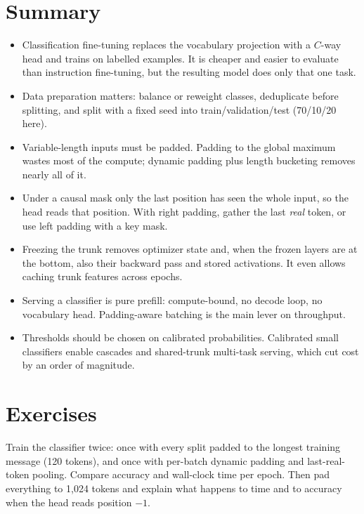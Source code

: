 \section{Summary}\label{sec:classify:summary}
\begin{itemize}
\item Classification fine-tuning replaces the vocabulary projection with a $C$-way head
and trains on labelled examples. It is cheaper and easier to evaluate than instruction
fine-tuning, but the resulting model does only that one task.
\item Data preparation matters: balance or reweight classes, deduplicate before
splitting, and split with a fixed seed into train/validation/test (70/10/20 here).
\item Variable-length inputs must be padded. Padding to the global maximum wastes most
of the compute; dynamic padding plus length bucketing removes nearly all of it.
\item Under a causal mask only the last position has seen the whole input, so the head
reads that position. With right padding, gather the last \emph{real} token, or use left
padding with a key mask.
\item Freezing the trunk removes optimizer state and, when the frozen layers are at the
bottom, also their backward pass and stored activations. It even allows caching trunk
features across epochs.
\item Serving a classifier is pure prefill: compute-bound, no decode loop, no vocabulary
head. Padding-aware batching is the main lever on throughput.
\item Thresholds should be chosen on calibrated probabilities. Calibrated small
classifiers enable cascades and shared-trunk multi-task serving, which cut cost by an
order of magnitude.
\end{itemize}

\section{Exercises}\label{sec:classify:exercises}

\begin{exercise}
Train the classifier twice: once with every split padded to the longest training
message (120 tokens), and once with per-batch dynamic padding and last-real-token
pooling. Compare accuracy and wall-clock time per epoch. Then pad everything to 1{,}024
tokens and explain what happens to time and to accuracy when the head reads position
$-1$.
\end{exercise}

